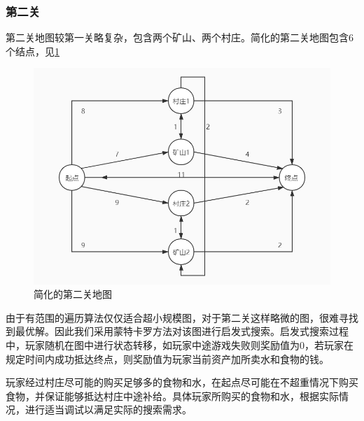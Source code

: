 \documentclass[withoutpre]{cumcmthesis} %
\begin{document}
\subsubsection{第二关}
第二关地图较第一关略复杂，包含两个矿山、两个村庄。简化的第二关地图包含6个结点，见\cref{fig:map2}
\begin{figure}[H]
	\centering
	\includegraphics[scale=0.5]{figures/map2.jpg}
	\caption{简化的第二关地图}
	\label{fig:map2}
\end{figure}
由于有范围的遍历算法仅仅适合超小规模图，对于第二关这样略微的图，很难寻找到最优解。因此我们采用蒙特卡罗方法对该图进行启发式搜索。启发式搜索过程中，玩家随机在图中进行状态转移，如玩家中途游戏失败则奖励值为0，若玩家在规定时间内成功抵达终点，则奖励值为玩家当前资产加所卖水和食物的钱。

玩家经过村庄尽可能的购买足够多的食物和水，在起点尽可能在不超重情况下购买食物，并保证能够抵达村庄中途补给。具体玩家所购买的食物和水，根据实际情况，进行适当调试以满足实际的搜索需求。
\end{document}
